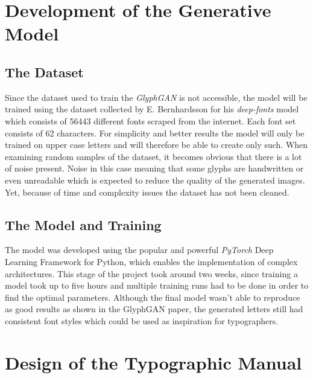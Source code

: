 \documentclass[11pt]{article}
\begin{document}
\section{Development of the Generative Model}
\subsection{The Dataset}
Since the dataset used to train the \emph{GlyphGAN} is not accessible, the model will be trained using the dataset collected by E. Bernhardsson for his \emph{deep-fonts} model which consists of 56443 different fonts scraped from the internet. Each font set consists of 62 characters. For simplicity and better results the model will only be trained on upper case letters and will therefore be able to create only such. When examining random samples of the dataset, it becomes obvious that there is a lot of noise present. Noise in this case meaning that some glyphs are handwritten or even unreadable which is expected to reduce the quality of the generated images. Yet, because of time and complexity issues the dataset has not been cleaned.

\subsection{The Model and Training}
The model was developed using the popular and powerful \emph{PyTorch} \cite{paszke2019pytorch} Deep Learning Framework for Python, which enables the implementation of complex architectures.
This stage of the project took around two weeks, since training a model took up to five hours and multiple training runs had to be done in order to find the optimal parameters. Although the final model wasn't able to reproduce as good results as shown in the GlyphGAN paper, the generated letters still had consistent font styles which could be used as inspiration for typographers.

\section{Design of the Typographic Manual}
\end{document}

